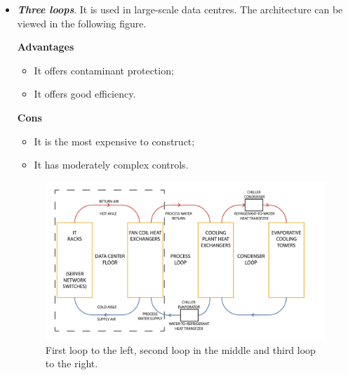 \begin{itemize}
	\item \textbf{\emph{Three loops}}. It is used in large-scale data centres. The architecture can be viewed in the following figure.
	\begin{flushleft}
		\textcolor{Green3}{ \textbf{Advantages}}
	\end{flushleft}
	\begin{itemize}
		\item It offers contaminant protection;
		\item It offers good efficiency.
	\end{itemize}
	\begin{flushleft}
		\textcolor{Red2}{ \textbf{Cons}}
	\end{flushleft}
	\begin{itemize}
		\item It is the most expensive to construct;
		\item It has moderately complex controls.
	\end{itemize}
	\begin{figure}[!htp]
		\centering
		\includegraphics[width=\textwidth]{img/components-dc-4.png}
		\caption*{First loop to the left, second loop in the middle and third loop to the right.}
	\end{figure}
\end{itemize}

\newpage

